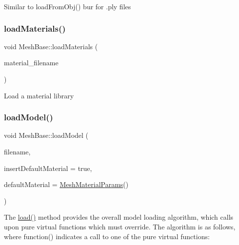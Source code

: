 Similar to load\+From\+Obj() bur for .ply files \mbox{\label{class_mesh_base_a2abeac2d137eaea650ef5252cf81997a}} 
\subsubsection{\texorpdfstring{load\+Materials()}{loadMaterials()}}
{\footnotesize\ttfamily void Mesh\+Base\+::load\+Materials (\begin{DoxyParamCaption}\item[{const std\+::string \&}]{material\+\_\+filename }\end{DoxyParamCaption})}

Load a material library \mbox{\label{class_mesh_base_a7280f0d6bacd225bb2d0263f17c05e8f}} 
\subsubsection{\texorpdfstring{load\+Model()}{loadModel()}}
{\footnotesize\ttfamily void Mesh\+Base\+::load\+Model (\begin{DoxyParamCaption}\item[{const std\+::string \&}]{filename,  }\item[{bool}]{insert\+Default\+Material = {\ttfamily true},  }\item[{const \hyperlink{class_mesh_material_params}{Mesh\+Material\+Params} \&}]{default\+Material = {\ttfamily \hyperlink{class_mesh_material_params}{Mesh\+Material\+Params}()} }\end{DoxyParamCaption})\hspace{0.3cm}{\ttfamily [virtual]}}

The \hyperlink{group___c_u_d_a_module_ga2786ba75af2a254c03f272b6211b6379}{load()} method provides the overall model loading algorithm, which calls upon pure virtual functions which must override. The algorithm is as follows, where \textquotesingle{}function()\textquotesingle{} indicates a call to one of the pure virtual functions\+:


